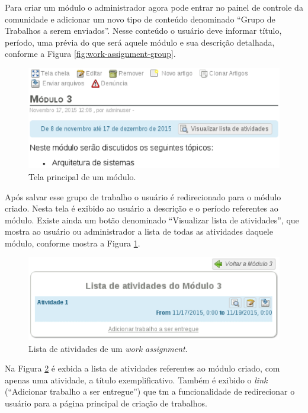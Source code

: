 Para criar um módulo o administrador agora pode entrar no painel de controle da comunidade e adicionar um novo tipo de conteúdo denominado ``Grupo de Trabalhos a serem enviados''. Nesse conteúdo o usuário deve informar título, período, uma prévia do que será aquele módulo e sua descrição detalhada, conforme a Figura \ref{fig:work-assignment-group}.

\begin{figure}[h]
    \centering
    \includegraphics[keepaspectratio=true,scale=0.6]
      {figuras/principal-group.eps}
    \caption{Tela principal de um módulo.}
    \label{fig:principal-group}
\end{figure}

Após salvar esse grupo de trabalho o usuário é redirecionado para o módulo criado. Nesta tela é exibido ao usuário a descrição e o período referentes ao módulo. Existe ainda um botão denominado ``Visualizar lista de atividades'', que mostra ao usuário ou administrador a lista de todas as atividades daquele módulo, conforme mostra a Figura \ref{fig:principal-group}.

\begin{figure}[h]
    \centering
    \includegraphics[keepaspectratio=true,scale=0.6]
      {figuras/lista-atividades.eps}
    \caption{Lista de atividades de um \textit{work assignment}.}
    \label{fig:lista-atividades}
\end{figure}

Na Figura \ref{fig:lista-atividades} é exbida a lista de atividades referentes ao módulo criado, com apenas uma atividade, a título exemplificativo. Também é exibido o \textit{link} (``Adicionar trabalho a ser entregue'') que tm a funcionalidade de redirecionar o usuário para a página principal de criação de trabalhos.

